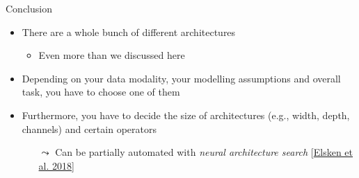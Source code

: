 \documentclass[aspectratio=169]{../latex_main/tntbeamer}  %
\begin{document}

        \begin{frame}{Conclusion}


            \begin{itemize}
                \item There are a whole bunch of different architectures
                \begin{itemize}
                    \item Even more than we discussed here
                \end{itemize}
                \item Depending on your data modality, your modelling assumptions and overall task, you have to choose one of them 
                \item Furthermore, you have to decide the size of architectures (e.g., width, depth, channels) and certain operators
                \begin{itemize}
                    \item[$\leadsto$] Can be partially automated with \emph{neural architecture search} [\href{https://arxiv.org/abs/1808.05377}{Elsken et al. 2018}]
                \end{itemize}
            \end{itemize}


        


        \end{frame}

 	
\end{document}
